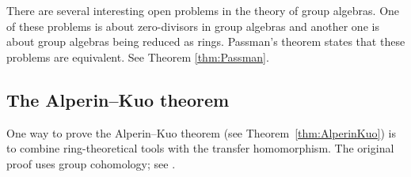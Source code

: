 There are several interesting open problems in the theory of group algebras. One 
of these problems is about zero-divisors in group algebras and another one 
is about group algebras being reduced as rings. Passman's theorem states
that these problems are equivalent. See Theorem \ref{thm:Passman}. 

\subsection*{The Alperin--Kuo theorem}

One way to prove the Alperin--Kuo theorem (see Theorem~\ref{thm:AlperinKuo}) 
is to combine 
ring-theoretical tools with the transfer homomorphism. The original 
proof uses group cohomology; see \cite{MR214674}. 
